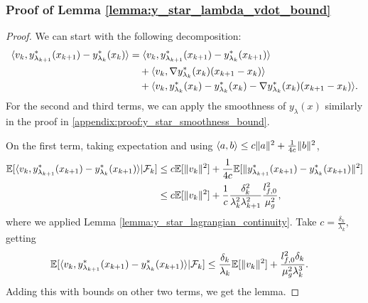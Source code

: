 \subsubsection{Proof of Lemma \ref{lemma:y_star_lambda_vdot_bound}}
\label{appendix:proof:y_star_lambda_smoothness_bound}
\begin{proof}
    We can start with the following decomposition:
    \begin{align*}
        \langle v_k, y_{\lambda_{k+1}}^*(x_{k+1}) - y_{\lambda_k}^* (x_k) \rangle &= \langle v_k, y_{\lambda_{k+1}}^*(x_{k+1}) - y_{\lambda_k}^* (x_{k+1}) \rangle \\
        &\quad + \langle v_k, \nabla y_{\lambda_k}^*(x_k) (x_{k+1} - x_k) \rangle \\
        &\quad + \langle v_k, y_{\lambda_k}^*(x_{k}) - y_{\lambda_k}^*(x_k) - \nabla y_{\lambda_{k}}^*(x_k) (x_{k+1} - x_k) \rangle.
    \end{align*}
    For the second and third terms, we can apply the smoothness of $y_{\lambda}(x)$ similarly in the proof in \ref{appendix:proof:y_star_smoothness_bound}. 
    
    On the first term, taking expectation and using $\langle a, b \rangle \le c \|a\|^2 + \frac{1}{4c} \|b\|^2$,
    \begin{align*}
        \mathbb{E}[\langle v_k, y_{\lambda_{k+1}}^*(x_{k+1}) - y_{\lambda_k}^* (x_{k+1}) \rangle | \mathcal{F}_k]
        &\le c \mathbb{E}[\|v_k\|^2] + \frac{1}{4c} \mathbb{E}[\|y_{\lambda_{k+1}}^*(x_{k+1}) - y_{\lambda_k}^* (x_{k+1})\|^2 ] \\
        &\le c \mathbb{E}[\|v_k\|^2] + \frac{1}{c} \frac{\delta_k^2}{\lambda_k^2 \lambda_{k+1}^2} \frac{l_{f,0}^2}{\mu_g^2},
    \end{align*}
    where we applied Lemma \ref{lemma:y_star_lagrangian_continuity}. Take $c = \frac{\delta_k}{\lambda_k}$, getting
    \begin{align*}
        \mathbb{E}[\langle v_k, y_{\lambda_{k+1}}^*(x_{k+1}) - y_{\lambda_k}^* (x_{k+1}) \rangle | \mathcal{F}_k]
        &\le \frac{\delta_k}{\lambda_k} \mathbb{E}[\|v_k\|^2] + \frac{l_{f,0}^2 \delta_k}{\mu_g^2 \lambda_k^3}. 
    \end{align*}
    Adding this with bounds on other two terms, we get the lemma.
\end{proof}















